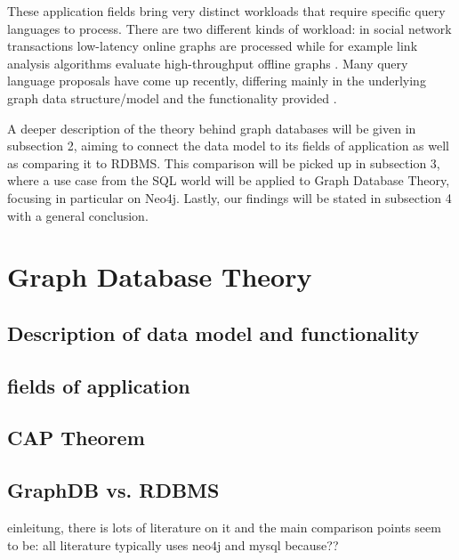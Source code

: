 These application fields bring very distinct workloads that require specific query languages to process. There are two different kinds of workload: in social network transactions low-latency online graphs are processed while for example link analysis algorithms evaluate high-throughput offline graphs \cite{Angles2018AnIT}. Many query language proposals have come up recently, differing mainly in the underlying graph data structure/model and the functionality provided \cite{Wood2012QueryLF}.

A deeper description of the theory behind graph databases will be given in subsection 2, aiming to connect the data model to its fields of application as well as comparing it to RDBMS. This comparison will be picked up in subsection 3, where a use case from the SQL world will be applied to Graph Database Theory, focusing in particular on Neo4j. Lastly, our findings will be stated in subsection 4 with a general conclusion.


\section{Graph Database Theory}
\subsection{Description of data model and functionality}
\subsection{fields of application}
\subsection{CAP Theorem}
\subsection{GraphDB vs. RDBMS}
einleitung, there is lots of literature on it and the main comparison points seem to be: all literature typically uses neo4j and mysql because??

